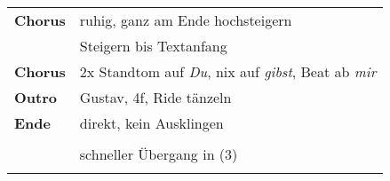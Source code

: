 \begin{tabular}{p{1.6cm}l}
	\textbf{Chorus} & ruhig, ganz am Ende hochsteigern                                          \\
	                & Steigern bis Textanfang                                                   \\
	\textbf{Chorus} & 2x Standtom auf \textit{Du}, nix auf \textit{gibst}, Beat ab \textit{mir} \\
	\textbf{Outro}  & Gustav, 4f, Ride tänzeln                                                  \\
	\textbf{Ende}   & direkt, kein Ausklingen                                                   \\
	                &                                                                           \\
	                & schneller Übergang in (3)                                                 \\
	                &                                                                           \\
\end{tabular}

